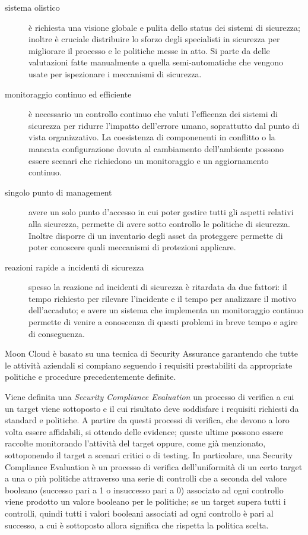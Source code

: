 \begin{description}
	\label{list:security-assurance-fondamentals}
	\item[sistema olistico] è richiesta una visione globale e pulita dello status dei sistemi di sicurezza; inoltre è cruciale 
	distribuire lo sforzo degli specialisti in sicurezza per migliorare il processo e le politiche messe in atto. Si parte da 
	delle valutazioni fatte manualmente a quella semi-automatiche che vengono usate per ispezionare i meccanismi di sicurezza. 
	\item[monitoraggio continuo ed efficiente] è necessario un controllo continuo che valuti l'efficenza dei sistemi di sicurezza 
	per ridurre l'impatto dell'errore umano, soprattutto dal punto di vista organizzativo. La coesistenza di componenenti in conflitto o
	la mancata configurazione dovuta al	cambiamento dell'ambiente possono essere scenari che richiedono un monitoraggio e un 
	aggiornamento continuo.
	\item[singolo punto di management] avere un solo punto d'accesso in cui poter gestire tutti gli aspetti relativi alla sicurezza, 
	permette di avere sotto controllo le politiche di sicurezza. Inoltre disporre di un inventario degli asset da proteggere permette di
	poter conoscere quali meccanismi di protezioni applicare.
	\item[reazioni rapide a incidenti di sicurezza] spesso la reazione ad incidenti di sicurezza è ritardata da due fattori: il tempo 
	richiesto per rilevare l'incidente e il tempo per analizzare il motivo dell'accaduto; e avere un sistema che implementa un monitoraggio
	continuo permette di venire a conoscenza di questi problemi in breve tempo e agire di conseguenza.
\end{description}


Moon Cloud è basato su una tecnica di Security Assurance garantendo che tutte le attività aziendali si compiano seguendo i requisiti 
prestabiliti da appropriate politiche e procedure precedentemente definite.

Viene definita una \textit{Security Compliance Evaluation} un processo di verifica a cui un target viene sottoposto e il cui risultato 
deve soddisfare i requisiti richiesti da standard e politiche. A partire da questi processi di verifica, che devono a loro volta essere 
affidabili, si ottendo delle evidence; queste ultime possono essere raccolte monitorando l'attività del target oppure, come già 
menzionato, sottoponendo il target a scenari critici o di testing.
In particolare, una Security Compliance Evaluation è un processo di verifica dell'uniformità di un certo target a una o più politiche 
attraverso una serie di controlli che a seconda del valore booleano (successo pari a 1 o insuccesso pari a 0) associato ad ogni controllo viene prodotto 
un valore booleano per le politiche; se un target supera tutti i controlli, quindi tutti i valori booleani associati ad ogni controllo
è pari al successo, a cui è sottoposto allora significa che rispetta la politica scelta. 

